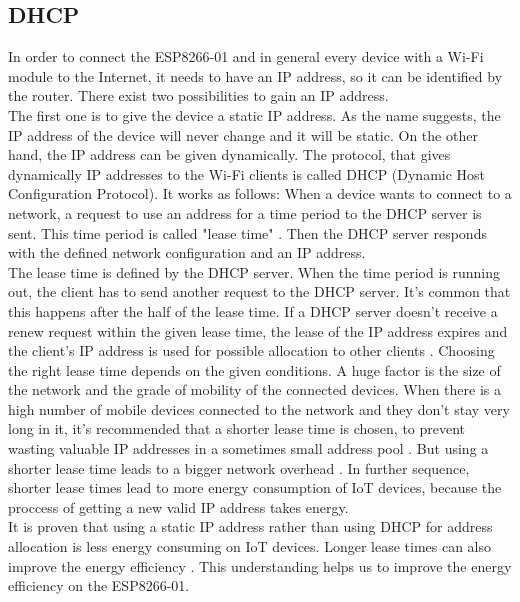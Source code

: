 \subsection{DHCP}
In order to connect the ESP8266-01 and in general every device with a Wi-Fi module to the Internet, it needs to have an IP address, so it can be identified by the router. 
There exist two possibilities to gain an IP address.\\ The first one is to give the device a static IP address. As the name suggests, the IP address of the device will never change and it will be static. On the other hand, the IP address can be given dynamically.
The protocol, that gives dynamically IP addresses to the Wi-Fi clients is called DHCP (Dynamic Host Configuration Protocol).
It works as follows: When a device wants to connect to a network, a request to use an address for a time period to the DHCP server is sent. This time period is called "lease time" \cite{droms1997rfc2131}. Then the DHCP server responds with the defined network configuration and an IP address.\\
The lease time is defined by the DHCP server. When the time period is running out, the client has to send another request to the DHCP server. It's common that this happens after the half of the lease time.
If a DHCP server doesn't receive a renew request within the given lease time, the lease of the IP address expires and the client's IP address is used for possible allocation to other clients \cite{10.1145/1298306.1298315}.
Choosing the right lease time depends on the given conditions. A huge factor is the size of the network and the grade of mobility of the connected devices. When there is a high number of mobile devices connected to the network and they don't stay very long in it, it's recommended that a shorter lease time is chosen, to prevent wasting valuable IP addresses in a sometimes small address pool \cite{khadilkar2007usage}.
But using a shorter lease time leads to a bigger network overhead \cite{li_how_2018}. In further sequence, shorter lease times lead to more energy consumption of IoT devices, because the proccess of getting a new valid IP address takes energy.\\
It is proven that using a static IP address rather than using DHCP for address allocation is less energy consuming on IoT devices. Longer lease times can also improve the energy efficiency \cite{department_of_computer_engineering_mehmet_akif_ersoy_university_faculty_of_engineering_and_architecture_burdur_turkey_power_2020}. This understanding helps us to improve the energy efficiency on the ESP8266-01.



